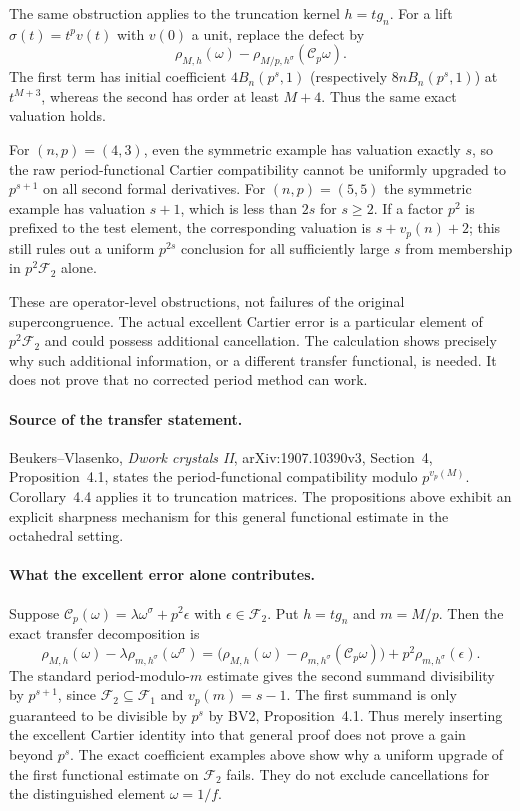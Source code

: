 \documentclass[11pt,a4paper]{article}
\theoremstyle{definition}\newtheorem{definition}[theorem]{Definition}
\theoremstyle{remark}\newtheorem{remark}[theorem]{Remark}
\numberwithin{equation}{section}
\begin{document}
The same obstruction applies to the truncation kernel $h=tg_n$.
For a lift $\sigma(t)=t^pv(t)$ with $v(0)$ a unit, replace the defect by
\[
 \rho_{M,h}(\omega)-\rho_{M/p,h^\sigma}(\mathscr C_p\omega).
\]
The first term has initial coefficient $4B_n(p^s,1)$ (respectively
$8nB_n(p^s,1)$) at $t^{M+3}$, whereas the second has order at least
$M+4$.  Thus the same exact valuation holds.

For $(n,p)=(4,3)$, even the symmetric example has valuation exactly
$s$, so the raw period-functional Cartier compatibility cannot be
uniformly upgraded to $p^{s+1}$ on all second formal derivatives.
For $(n,p)=(5,5)$ the symmetric example has valuation $s+1$, which is
less than $2s$ for $s\geq2$.  If a factor $p^2$ is prefixed to the
test element, the corresponding valuation is $s+v_p(n)+2$;
this still rules out a uniform $p^{2s}$ conclusion for all sufficiently
large $s$ from membership in $p^2\mathscr F_2$ alone.

These are operator-level obstructions, not failures of the original
supercongruence.  The actual excellent Cartier error is a particular
element of $p^2\mathscr F_2$ and could possess additional cancellation.
The calculation shows precisely why such additional information, or a
different transfer functional, is needed.  It does not prove that no
corrected period method can work.

\paragraph{Source of the transfer statement.}
Beukers--Vlasenko, \emph{Dwork crystals II}, arXiv:1907.10390v3,
Section~4, Proposition~4.1, states the period-functional compatibility
modulo $p^{v_p(M)}$.  Corollary~4.4 applies it to truncation matrices.
The propositions above exhibit an explicit sharpness mechanism for
this general functional estimate in the octahedral setting.

\paragraph{What the excellent error alone contributes.}
Suppose $\mathscr C_p(\omega)=\lambda\omega^\sigma+p^2\epsilon$
with $\epsilon\in\mathscr F_2$.  Put $h=tg_n$ and $m=M/p$.
Then the exact transfer decomposition is
\[
 \rho_{M,h}(\omega)-\lambda\rho_{m,h^\sigma}(\omega^\sigma)
 =\bigl(\rho_{M,h}(\omega)-\rho_{m,h^\sigma}(\mathscr C_p\omega)\bigr)
   +p^2\rho_{m,h^\sigma}(\epsilon).
\]
The standard period-modulo-$m$ estimate gives the second summand
divisibility by $p^{s+1}$, since $\mathscr F_2\subseteq\mathscr F_1$
and $v_p(m)=s-1$.  The first summand is only guaranteed to be divisible
by $p^s$ by BV2, Proposition~4.1.  Thus merely inserting the excellent
Cartier identity into that general proof does not prove a gain beyond
$p^s$.  The exact coefficient examples above show why a uniform upgrade
of the first functional estimate on $\mathscr F_2$ fails.  They do not
exclude cancellations for the distinguished element $\omega=1/f$.
\end{document}
